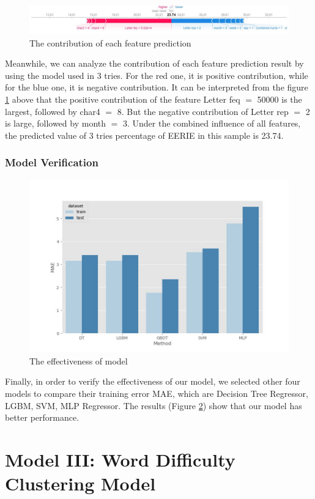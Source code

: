 \documentclass[
  journal=medium,
  manuscript=Report,
  year=2023,
  volume=37,
]{cup-journal}
\begin{document}
\begin{figure}[hbt!]
    \centering
    \includegraphics[width=\linewidth]{pic/单词特征影响.jpg}
    \caption{The contribution of each feature prediction}
    \label{feature influence}
\end{figure}

Meanwhile, we can analyze the contribution of each feature prediction result by using the model used in 3 tries. For the red one, it is positive contribution, while for the blue one, it is negative contribution. It can be interpreted from the figure \ref{feature influence} above that the positive contribution of the feature Letter feq $=$ 50000 is the largest, followed by char4 $=$ 8. But the negative contribution of Letter rep $=$ 2 is large, followed by month $=$ 3. Under the combined influence of all features, the predicted value of 3 tries percentage of EERIE in this sample is 23.74.

\subsubsection{Model Verification}

\begin{figure}[hbt!]
    \centering
    \includegraphics[width=0.6\linewidth]{pic/各方法对比图.jpg}
    \caption{The effectiveness of model}
    \label{effectiveness}
\end{figure}

Finally, in order to verify the effectiveness of our model, we selected other four models to compare their training error MAE, which are Decision Tree Regressor, LGBM, SVM, MLP Regressor. The results (Figure \ref{effectiveness}) show that our model has better performance.

\section{Model III: Word Difficulty Clustering Model}
\end{document}
